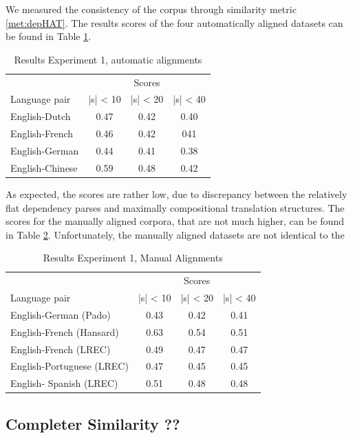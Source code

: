 \documentclass{report}
\theoremstyle{break}
\begin{document}
We measured the consistency of the corpus through similarity metric \ref{met:depHAT}. The results scores of the four automatically aligned datasets can be found in Table \ref{tab:scores1}.

\begin{table}[!h]
\centering
\begin{tabular}{l|ccc}
& \multicolumn{3}{c}{Scores}\\
Language pair & |s| < 10 & |s| < 20 & |s| < 40\\
\hline
English-Dutch & 0.47 & 0.42 & 0.40 \\
English-French & 0.46 & 0.42 & 041 \\
English-German & 0.44 & 0.41 & 0.38 \\
English-Chinese & 0.59 & 0.48 & 0.42\\
\end{tabular}
\caption{Results Experiment 1, automatic alignments}\label{tab:scores1}
\end{table}

As expected, the scores are rather low, due to discrepancy between the relatively flat dependency parses and maximally compositional translation structures. The scores for the manually aligned corpora, that are not much higher, can be found in Table \ref{tab:scores2}. Unfortunately, the manually aligned datasets are not identical to the 

\begin{table}[!h]
\centering
\begin{tabular}{l|ccc}
& \multicolumn{3}{c}{Scores}\\
Language pair & |s| < 10 & |s| < 20 & |s| < 40\\
\hline
English-German (Pado) & 0.43 & 0.42 & 0.41 \\
English-French (Hansard) & 0.63 & 0.54 & 0.51 \\
English-French (LREC) & 0.49 & 0.47 & 0.47 \\
English-Portuguese (LREC) & 0.47 & 0.45 & 0.45 \\
English- Spanish (LREC) & 0.51 & 0.48 & 0.48\\
\end{tabular}
\caption{Results Experiment 1, Manual Alignments}\label{tab:scores2}
\end{table}

\subsection{Completer Similarity ??}
\end{document}
